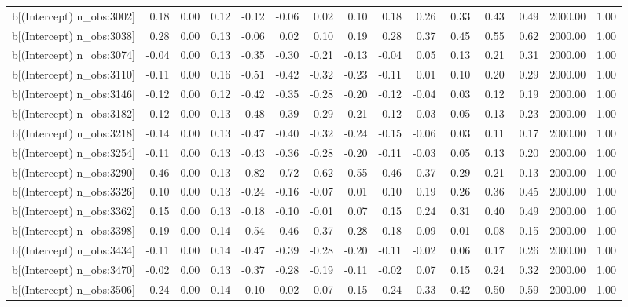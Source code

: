 \begin{table}[ht]
\begin{tabular}{rrrrrrrrrrrrrrr}
  b[(Intercept) n\_obs:3002] & 0.18 & 0.00 & 0.12 & -0.12 & -0.06 & 0.02 & 0.10 & 0.18 & 0.26 & 0.33 & 0.43 & 0.49 & 2000.00 & 1.00 \\ 
  b[(Intercept) n\_obs:3038] & 0.28 & 0.00 & 0.13 & -0.06 & 0.02 & 0.10 & 0.19 & 0.28 & 0.37 & 0.45 & 0.55 & 0.62 & 2000.00 & 1.00 \\ 
  b[(Intercept) n\_obs:3074] & -0.04 & 0.00 & 0.13 & -0.35 & -0.30 & -0.21 & -0.13 & -0.04 & 0.05 & 0.13 & 0.21 & 0.31 & 2000.00 & 1.00 \\ 
  b[(Intercept) n\_obs:3110] & -0.11 & 0.00 & 0.16 & -0.51 & -0.42 & -0.32 & -0.23 & -0.11 & 0.01 & 0.10 & 0.20 & 0.29 & 2000.00 & 1.00 \\ 
  b[(Intercept) n\_obs:3146] & -0.12 & 0.00 & 0.12 & -0.42 & -0.35 & -0.28 & -0.20 & -0.12 & -0.04 & 0.03 & 0.12 & 0.19 & 2000.00 & 1.00 \\ 
  b[(Intercept) n\_obs:3182] & -0.12 & 0.00 & 0.13 & -0.48 & -0.39 & -0.29 & -0.21 & -0.12 & -0.03 & 0.05 & 0.13 & 0.23 & 2000.00 & 1.00 \\ 
  b[(Intercept) n\_obs:3218] & -0.14 & 0.00 & 0.13 & -0.47 & -0.40 & -0.32 & -0.24 & -0.15 & -0.06 & 0.03 & 0.11 & 0.17 & 2000.00 & 1.00 \\ 
  b[(Intercept) n\_obs:3254] & -0.11 & 0.00 & 0.13 & -0.43 & -0.36 & -0.28 & -0.20 & -0.11 & -0.03 & 0.05 & 0.13 & 0.20 & 2000.00 & 1.00 \\ 
  b[(Intercept) n\_obs:3290] & -0.46 & 0.00 & 0.13 & -0.82 & -0.72 & -0.62 & -0.55 & -0.46 & -0.37 & -0.29 & -0.21 & -0.13 & 2000.00 & 1.00 \\ 
  b[(Intercept) n\_obs:3326] & 0.10 & 0.00 & 0.13 & -0.24 & -0.16 & -0.07 & 0.01 & 0.10 & 0.19 & 0.26 & 0.36 & 0.45 & 2000.00 & 1.00 \\ 
  b[(Intercept) n\_obs:3362] & 0.15 & 0.00 & 0.13 & -0.18 & -0.10 & -0.01 & 0.07 & 0.15 & 0.24 & 0.31 & 0.40 & 0.49 & 2000.00 & 1.00 \\ 
  b[(Intercept) n\_obs:3398] & -0.19 & 0.00 & 0.14 & -0.54 & -0.46 & -0.37 & -0.28 & -0.18 & -0.09 & -0.01 & 0.08 & 0.15 & 2000.00 & 1.00 \\ 
  b[(Intercept) n\_obs:3434] & -0.11 & 0.00 & 0.14 & -0.47 & -0.39 & -0.28 & -0.20 & -0.11 & -0.02 & 0.06 & 0.17 & 0.26 & 2000.00 & 1.00 \\ 
  b[(Intercept) n\_obs:3470] & -0.02 & 0.00 & 0.13 & -0.37 & -0.28 & -0.19 & -0.11 & -0.02 & 0.07 & 0.15 & 0.24 & 0.32 & 2000.00 & 1.00 \\ 
  b[(Intercept) n\_obs:3506] & 0.24 & 0.00 & 0.14 & -0.10 & -0.02 & 0.07 & 0.15 & 0.24 & 0.33 & 0.42 & 0.50 & 0.59 & 2000.00 & 1.00 \\ 

\end{tabular}
\end{table}
